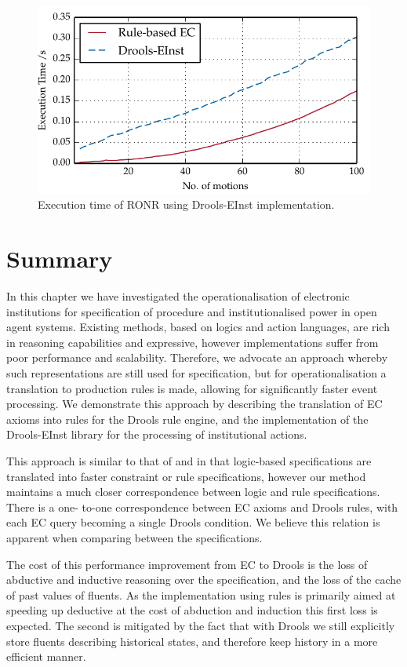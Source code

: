 \begin{figure}
\centering
\caption{Execution time of RONR using Drools-EInst implementation.}\label{fig:droolsperf}
\includegraphics{gfx/ec/droolsvsrules}
\end{figure}

\section{Summary}

In this chapter we have investigated the operationalisation of electronic
institutions for specification of procedure and institutionalised power in
open agent systems. Existing methods, based on logics and action languages,
are rich in reasoning capabilities and expressive, however implementations
suffer from poor performance and scalability. Therefore, we advocate an
approach whereby such representations are still used for specification, but
for operationalisation a translation to production rules is made, allowing for
significantly faster event processing. We demonstrate this approach by
describing the translation of \ac{EC} axioms into rules for the Drools rule
engine, and the implementation of the Drools-EInst library for the processing
of institutional actions.

This approach is similar to that of \citet{Arcos2005} and
\citet{Aldewereld2006} in that logic-based specifications are translated into
faster constraint or rule specifications, however our method maintains a much
closer correspondence between logic and rule specifications. There is a one-
to-one correspondence between \ac{EC} axioms and Drools rules, with each
\ac{EC} query becoming a single Drools condition. We believe this relation is
apparent when comparing between the specifications.

The cost of this performance improvement from \ac{EC} to Drools is the loss of
abductive and inductive reasoning over the specification, and the loss of the
cache of past values of fluents. As the implementation using rules is
primarily aimed at speeding up deductive at the cost of abduction and
induction this first loss is expected. The second is mitigated by the fact
that with Drools we still explicitly store fluents describing historical
states, and therefore keep history in a more efficient manner.

